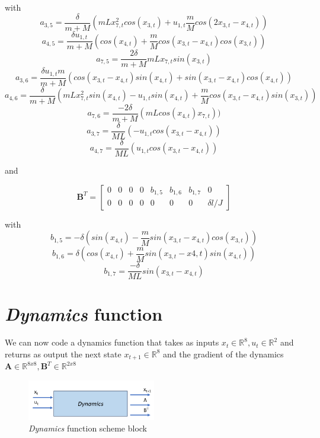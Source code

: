 with 
\[a_{3,5} = \frac{\delta}{m+M} (m L x_{7,t}^2 cos(x_{3,t}) + u_{1,t} \frac{m}{M} cos(2 x_{3,t} - x_{4,t})) \]
\[a_{4,5} = \frac{\delta u_{1,t}}{m+M} (cos(x_{4,t}) + \frac{m}{M} cos(x_{3,t} - x_{4,t}) cos(x_{3,t}))\]
\[a_{7,5} = \frac{2 \delta}{m+M} m L x_{7,t} sin(x_{3,t})\]
\[a_{3,6} = \frac{\delta u_{1,t} m}{m+M} (cos(x_{3,t}-x_{4,t}) sin(x_{4,t}) + sin(x_{3,t}-x_{4,t}) cos(x_{4,t}))\]
\[a_{4,6} = \frac{\delta}{m+M} (m L x_{7,t}^2 sin(x_{4,t}) - u_{1,t} sin(x_{4,t}) + \frac{m}{M} cos(x_{3,t}-x_{4,t}) sin(x_{3,t}))\]
\[a_{7,6} = \frac{-2\delta}{m+M} (m L cos(x_{4,t}) x_{7,t}))\]
\[a_{3,7} = \frac{\delta}{ML} (-u_{1,t} cos(x_{3,t}-x_{4,t}))\]
\[a_{4,7} = \frac{\delta}{ML} (u_{1,t} cos(x_{3,t}-x_{4,t}))\]

and 

\[
\textbf{B}^T
=
\begin{bmatrix}
    0 & 0 & 0 & 0 & b_{1,5} & b_{1,6} & b_{1,7} & 0 \\
    0 & 0 & 0 & 0 & 0 & 0 & 0 & \delta l /J 
\end{bmatrix}
\]

with 
\[b_{1,5} = - \delta (sin(x_{4,t}) - \frac{m}{M} sin(x_{3,t} - x_{4,t}) cos(x_{3,t}))\]
\[b_{1,6} = \delta (cos(x_{4,t}) + \frac{m}{M} sin(x_{3,t}-x{4,t}) sin(x_{4,t}))\]
\[b_{1,7} = \frac{-\delta}{ML} sin(x_{3,t}-x_{4,t})\]

\section{\textit{Dynamics} function}
We can now code a dynamics function that takes as inputs $x_t\in \mathbb{R}^8, u_t\in \mathbb{R}^2$ and returns as output the next state $x_{t+1}\in \mathbb{R}^8$ and the gradient of the dynamics $\textbf{A}\in \mathbb{R}^{8x8}, \textbf{B}^T\in \mathbb{R}^{2x8}$

\begin{figure}[htp]
\centering
\includegraphics[width=0.5\textwidth]{pictures/dynamics.png}
\caption{\textit{Dynamics} function scheme block}
\label{fig:dynamics}
\end{figure}